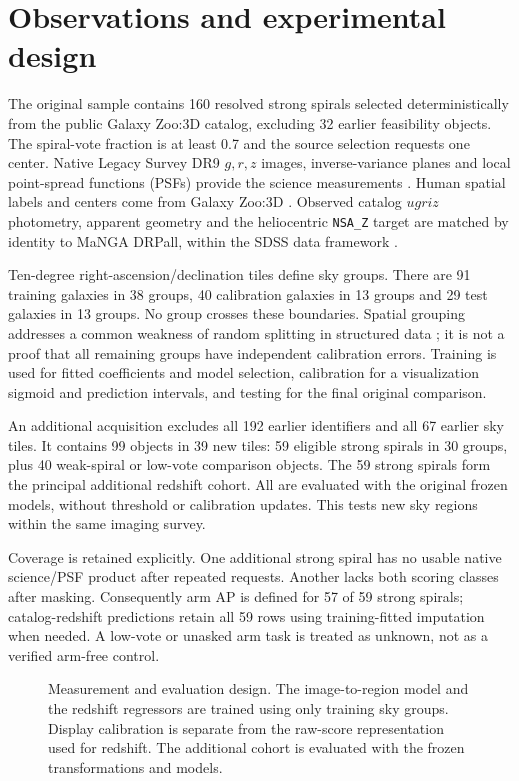 \documentclass[11pt]{article}
\begin{document}
\section{Observations and experimental design}
\label{sec:data}
The original sample contains 160 resolved strong spirals selected
deterministically from the public Galaxy Zoo:3D catalog, excluding 32 earlier
feasibility objects. The spiral-vote fraction is at least 0.7 and the source
selection requests one center. Native Legacy Survey DR9 $g,r,z$ images,
inverse-variance planes and local point-spread functions (PSFs) provide the
science measurements \citep{dey2019}. Human spatial labels and centers come from
Galaxy Zoo:3D \citep{masters2021}. Observed catalog $ugriz$ photometry, apparent
geometry and the heliocentric \texttt{NSA\_Z} target are matched by identity to
MaNGA DRPall, within the SDSS data framework
\citep{york2000,bundy2015,dr172022}.

Ten-degree right-ascension/declination tiles define sky groups. There are
91 training galaxies in 38 groups, 40 calibration galaxies in 13 groups and
29 test galaxies in 13 groups. No group crosses these boundaries. Spatial
grouping addresses a common weakness of random splitting in structured data
\citep{roberts2017}; it is not a proof that all remaining groups have independent
calibration errors. Training is used for fitted coefficients and model
selection, calibration for a visualization sigmoid and prediction intervals,
and testing for the final original comparison.

An additional acquisition excludes all 192 earlier identifiers and all 67
earlier sky tiles. It contains 99 objects in 39 new tiles: 59 eligible strong
spirals in 30 groups, plus 40 weak-spiral or low-vote comparison objects. The
59 strong spirals form the principal additional redshift cohort. All are
evaluated with the original frozen models, without threshold or calibration
updates. This tests new sky regions within the same imaging survey.

Coverage is retained explicitly. One additional strong spiral has no usable
native science/PSF product after repeated requests. Another lacks both scoring
classes after masking. Consequently arm AP is defined for 57 of 59 strong
spirals; catalog-redshift predictions retain all 59 rows using training-fitted
imputation when needed. A low-vote or unasked arm task is treated as unknown,
not as a verified arm-free control.

\begin{figure}[htbp]
\centering{}
\caption{Measurement and evaluation design. The image-to-region model and
the redshift regressors are trained using only training sky groups. Display
calibration is separate from the raw-score representation used for redshift.
The additional cohort is evaluated with the frozen transformations and models.}
\label{fig:pipeline}
\end{figure}
\end{document}
